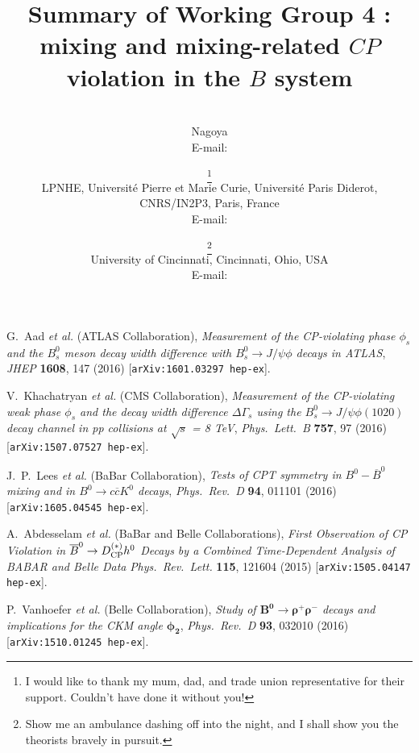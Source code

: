\documentclass{PoS}
\title{Summary of Working Group 4 : mixing and mixing-related $CP$ violation in the $B$ system}
\author{\speaker{Alessandro Gaz}\\
        Nagoya\\
        E-mail: \email{gaz@hepl.phys.nagoya-u.ac.jp}}
\author{
        \speaker{Vladimir V. Gligorov}\thanks{I would like to thank my mum, dad, and trade union representative for their support. Couldn't have done it without you!}\\
        LPNHE, Universit\'{e} Pierre et Marie Curie, Universit\'{e} Paris Diderot, CNRS/IN2P3, Paris, France\\
        E-mail: \email{vgligoro@lpnhe.in2p3.fr}
        }
\author{
        \speaker{Dean Robinson}\thanks{Show me an ambulance dashing off into the night, and I shall show you the theorists bravely in pursuit.}\\
        University of Cincinnati, Cincinnati, Ohio, USA\\
        E-mail: \email{dean.robinson@uc.edu}\\
        }
\begin{document}


%
%
%











%


\begin{thebibliography}{99}


  G.~Aad \emph{et al.} (ATLAS Collaboration),
  \emph{Measurement of the CP-violating phase $\phi_s$ and the $B^0_s$ meson decay width
    difference with $B^0_s \to J/\psi \phi$ decays in ATLAS},
  \emph{JHEP} {\bf 1608}, 147 (2016) [{\tt arXiv:1601.03297 hep-ex}].

  V.~Khachatryan \emph{et al.} (CMS Collaboration),
  \emph{Measurement of the CP-violating weak phase $\phi_s$ and the decay width difference
    $\Delta\Gamma_s$ using the $B^0_s \to J/\psi \phi(1020)$ decay channel in pp collisions
    at $\sqrt{s}$ = 8 TeV},
  \emph{Phys.~Lett.~B} {\bf 757}, 97 (2016) [{\tt arXiv:1507.07527 hep-ex}].

  J.~P.~Lees \emph{et al.} (BaBar Collaboration),
  \emph{Tests of CPT symmetry in $B^0-\overline{B}^0$ mixing and in $B^0 \to c\overline{c}K^0$ decays},
  \emph{Phys.~Rev.~D} {\bf 94}, 011101 (2016) [{\tt arXiv:1605.04545 hep-ex}].

  A.~Abdesselam \emph{et al.} (BaBar and Belle Collaborations),
  \emph{First Observation of CP Violation in $\overline{B}^0 \to
      D^{(*)}_{\rm CP} h^0$ Decays by a Combined Time-Dependent Analysis of BABAR and Belle Data}
  \emph{Phys.~Rev.~Lett.} {\bf 115}, 121604 (2015) [{\tt arXiv:1505.04147 hep-ex}].
  
  P.~Vanhoefer  \emph{et al.} (Belle Collaboration),
  \emph{Study of $\mathbf{B^{0}\rightarrow\rho^{+}\rho^{-}}$
    decays and implications for the CKM angle $\mathbf{\phi_2}$},
  \emph{Phys.~Rev.~D} {\bf 93}, 032010 (2016) [{\tt arXiv:1510.01245 hep-ex}].




\end{thebibliography}
  
\end{document}
